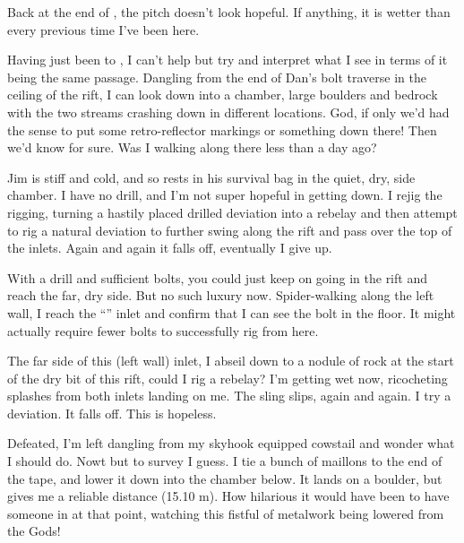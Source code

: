 Back at the end of , the pitch doesn't look hopeful. If
anything, it is wetter than every previous time I've been here.

Having just been to , I can't help but try and interpret
what I see in terms of it being the same passage. Dangling from the end
of Dan's bolt traverse in the ceiling of the rift, I can look down into
a chamber, large boulders and bedrock with the two streams crashing down
in different locations. God, if only we'd had the sense to put some
retro-reflector markings or something down there! Then we'd know for
sure. Was I walking along there less than a day ago?

Jim is stiff and cold, and so rests in his survival bag in the quiet,
dry, side chamber. I have no drill, and I'm not super hopeful in getting
down. I rejig the rigging, turning a hastily placed drilled deviation
into a rebelay and then attempt to rig a natural deviation to further
swing along the rift and pass over the top of the inlets. Again and
again it falls off, eventually I give up.

With a drill and sufficient bolts, you could just keep on going in the
rift and reach the far, dry side. But no such luxury now. Spider-walking
along the left wall, I reach the ``'' inlet and confirm
that I can see the bolt in the floor. It might actually require fewer
bolts to successfully rig from here.


The far side of this (left wall) inlet, I abseil down to a nodule of
rock at the start of the dry bit of this rift, could I rig a rebelay?
I'm getting wet now, ricocheting splashes from both inlets landing on
me. The sling slips, again and again. I try a deviation. It falls off.
This is hopeless.

Defeated, I'm left dangling from my skyhook equipped cowstail and wonder
what I should do. Nowt but to survey I guess. I tie a bunch of maillons
to the end of the tape, and lower it down into the chamber below. It
lands on a boulder, but gives me a reliable distance (15.10 m). How
hilarious it would have been to have someone in  at that
point, watching this fistful of metalwork being lowered from the Gods!

